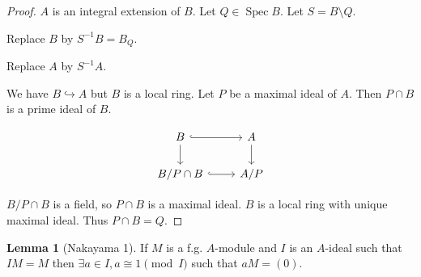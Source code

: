 \documentclass{article}
\theoremstyle{definition}
\newtheorem{lemma}[theorem]{Lemma}
\begin{document}
    \begin{proof}


        \(A\) is an integral extension of \(B\). Let \(Q \in \operatorname{Spec} B\). Let \(S = B \setminus Q\).

        Replace \(B\) by \(S ^{-1} B = B_Q\).

        Replace \(A\) by \(S ^{-1} A\).

        We have \(B \hookrightarrow A\) but \(B\) is a local ring. Let \(P\) be a maximal ideal of \(A\). Then \(P \cap B\) is a prime ideal of \(B\).
        
        \[
            \begin{tikzcd}
                B \ar[r, hook] \ar[d] & A \ar[d] \\ B / P\cap B \ar[r,hook] & A / P
            \end{tikzcd}
        \]

        \(B / P \cap B\) is a field, so \(P \cap B\) is a maximal ideal. \(B\) is a local ring with unique maximal ideal. Thus \(P \cap B = Q\).
    \end{proof}

    \begin{lemma}
        [Nakayama 1] If \(M\) is a f.g. \(A\)-module and \(I\) is an \(A\)-ideal such that \(IM = M\) then \(\exists a\in I, a\cong 1 \pmod I\) such that \(aM = (0)\).
    \end{lemma}
\end{document}
